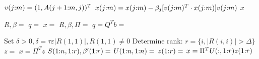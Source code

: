 \begin{refsection}
\begin{algorithm}
  \caption{Householder matrix application}
  \label{alg:houseapp}
  \begin{algorithmic}
    \State {}
    \State $v(j{:}m) = (1, A(j+1{:}m,j))^T$
    \State $x(j{:}m) = x(j{:}m) - \beta_j
           [v(j{:}m)^T \cdot x(j{:}m)] v(j{:}m)$
    \EndFor
    \State \Return $x$
    \EndFunction
  \end{algorithmic}
\end{algorithm}


\begin{algorithm}
  \caption{Linear equations solver}
  \label{alg:qrsol}
  \begin{algorithmic}
    \State {}
    \State {}

    \State {}
    \State $R,\beta = $ 
    \State $q =$  
    \State \Return $x =$  
    \Else
    \State $R,\beta,\Pi = $ 
    \State $q = Q^T b = $  

    \State Set $\delta > 0, \delta = \tau \varepsilon \lvert R(1,1) \rvert,
    R(1,1) \ne 0$
    \State Determine rank: $r = \{ i, \lvert R(i,i) \rvert > \Delta \}$
    \State {}
    \State $z =$ 
    \State \Return $x = \Pi^T z$
    \State {}
    \State {}
    \State $S(1{:}n,1{:}r),\beta'(1{:}r) = $
    \State $U(1{:}n,1{:}n)=$ 
    \State $z(1{:}r) = $ 
    \State \Return $x = \Pi^T U(:,1{:}r) z(1{:}r) $
    \EndIf
    \EndIf

    \EndFunction
  \end{algorithmic}
\end{algorithm}



\end{refsection}
